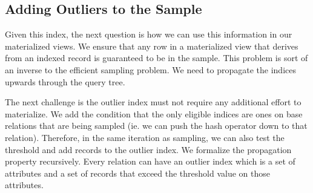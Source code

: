 \subsection{Adding Outliers to the Sample}
Given this index, the next question is how we can use this information in our materialized views.
We ensure that any row in a materialized view that derives from an indexed record is guaranteed to be in the sample.
This problem is sort of an inverse to the efficient sampling problem.
We need to propagate the indices upwards through the query tree.

The next challenge is the outlier index must not require any additional effort to materialize.
We add the condition that the only eligible indices are ones on base relations that are being sampled (ie. we can push the hash operator down to that relation).
Therefore, in the same iteration as sampling, we can also test the threshold and add records to the outlier index. 
We formalize the propagation property recursively. 
Every relation can have an outlier index which is a set of attributes and a set of records that exceed the threshold value on those attributes.

